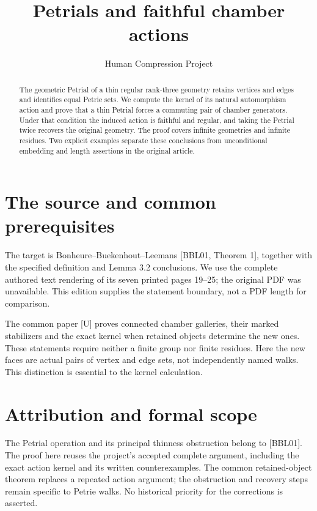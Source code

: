 
\title{Petrials and faithful chamber actions}
\author{Human Compression Project}
\date{}

\maketitle
\begin{abstract}
The geometric Petrial of a thin regular rank-three geometry retains
vertices and edges and identifies equal Petrie sets. We compute the
kernel of its natural automorphism action and prove that a thin
Petrial forces a commuting pair of chamber generators. Under that
condition the induced action is faithful and regular, and taking the
Petrial twice recovers the original geometry. The proof covers
infinite geometries and infinite residues. Two explicit examples
separate these conclusions from unconditional embedding and
length assertions in the original article.
\end{abstract}
\section{The source and common prerequisites}
The target is Bonheure--Buekenhout--Leemans [BBL01, Theorem 1], together
with the specified definition and Lemma 3.2 conclusions. We use the
complete authored text rendering of its seven printed pages 19--25;
the original PDF was unavailable. This edition supplies the statement
boundary, not a PDF length for comparison.

The common paper [U] proves connected chamber galleries, their marked
stabilizers and the exact kernel when retained objects determine the
new ones. These statements require neither a finite group nor finite
residues. Here the new faces are actual pairs of vertex and edge sets,
not independently named walks. This distinction is essential to the
kernel calculation.

\section*{Attribution and formal scope}
The Petrial operation and its principal thinness obstruction belong to
[BBL01]. The proof here reuses the project's accepted complete argument,
including the exact action kernel and its written counterexamples.
The common retained-object theorem replaces a repeated action argument;
the obstruction and recovery steps remain specific to Petrie walks.
No historical priority for the corrections is asserted.


